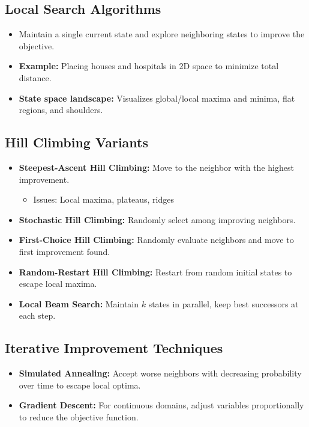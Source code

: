 \subsection{Local Search Algorithms}
\begin{itemize}
    \item Maintain a single current state and explore neighboring states to improve the objective.
    \item \textbf{Example:} Placing houses and hospitals in 2D space to minimize total distance.
    \item \textbf{State space landscape:} Visualizes global/local maxima and minima, flat regions, and shoulders.
\end{itemize}

\subsection{Hill Climbing Variants}
\begin{itemize}
    \item \textbf{Steepest-Ascent Hill Climbing:} Move to the neighbor with the highest improvement.
        \begin{itemize}
            \item Issues: Local maxima, plateaus, ridges
        \end{itemize}
    \item \textbf{Stochastic Hill Climbing:} Randomly select among improving neighbors.
    \item \textbf{First-Choice Hill Climbing:} Randomly evaluate neighbors and move to first improvement found.
    \item \textbf{Random-Restart Hill Climbing:} Restart from random initial states to escape local maxima.
    \item \textbf{Local Beam Search:} Maintain $k$ states in parallel, keep best successors at each step.
\end{itemize}

\subsection{Iterative Improvement Techniques}
\begin{itemize}
    \item \textbf{Simulated Annealing:} Accept worse neighbors with decreasing probability over time to escape local optima.
    \item \textbf{Gradient Descent:} For continuous domains, adjust variables proportionally to reduce the objective function.
\end{itemize}

